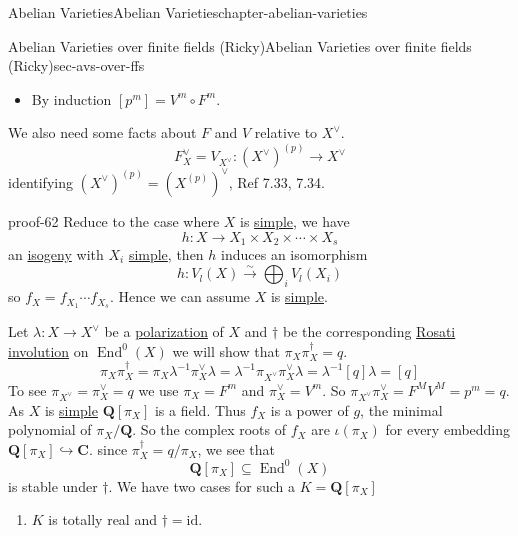 \documentclass[oneside,10pt,]{book}
\numberwithin{equation}{section}
\newcommand{\lb}{[}
\newcommand{\rb}{]}
\newcommand{\QQ}{\mathbf{Q}}
\newcommand{\CC}{\mathbf{C}}
\newcommand{\id}{\mathrm{id}}
\DeclareMathOperator{\End}{End}
\begin{document}
\begin{chapterptx}{Abelian Varieties}{}{Abelian Varieties}{}{}{chapter-abelian-varieties}
\begin{sectionptx}{Abelian Varieties over finite fields (Ricky)}{}{Abelian Varieties over finite fields (Ricky)}{}{}{sec-avs-over-ffs}
\begin{itemize}[label=\textbullet]
\item{}By induction \(\lb p^m\rb = V^m \circ F^m\).%
\end{itemize}
%
\par
\hypertarget{p-367}{}%
We also need some facts about \(F\) and \(V\) relative to \(X^\vee\).%
\begin{equation*}
F_X^\vee = V_{X^\vee} \colon (X^\vee)^{(p)} \to X^\vee
\end{equation*}
identifying \((X^\vee)^{(p)} = (X^{(p)})^\vee\), Ref 7.33, 7.34.%
\begin{proofptx}{}{proof-62}
\hypertarget{p-368}{}%
Reduce to the case where \(X\) is \hyperref[def-simple-av]{simple}, we have%
\begin{equation*}
h\colon X\to X_1 \times X_2 \times \cdots \times X_s
\end{equation*}
an \hyperref[def-supersing-isog-isog]{isogeny} with \(X_i\) \hyperref[def-simple-av]{simple}, then \(h\) induces an isomorphism%
\begin{equation*}
h\colon V_l(X)\xrightarrow{\sim} \bigoplus_i V_l(X_i)
\end{equation*}
so \(f_X = f_{X_1} \cdots f_{X_s}\). Hence we can assume \(X\) is \hyperref[def-simple-av]{simple}.%
\par
\hypertarget{p-369}{}%
Let \(\lambda \colon X \to X^\vee\) be a \hyperref[def-c-pol]{polarization} of \(X\) and \(\dagger\) be the corresponding \hyperref[sec-rosati]{Rosati involution} on \(\End^0(X)\) we will show that \(\pi_X\pi_X^\dagger = q\).%
\begin{equation*}
\pi_X \pi_X^\dagger = \pi_X \lambda^{-1} \pi_X^\vee \lambda = \lambda^{-1} \pi_{X^\vee} \pi_X^\vee \lambda = \lambda^{-1} \lb q \rb \lambda = \lb q \rb
\end{equation*}
To see \(\pi_{X^\vee} = \pi_X^\vee = q\) we use \(\pi_X = F^m\) and \(\pi_X^\vee = V^m \). So \(\pi_{X^\vee} \pi_X^\vee = F^MV^M = p^m = q\). As \(X\) is \hyperref[def-simple-av]{simple} \(\QQ\lb \pi_X\rb\) is a field. Thus \(f_X\) is a power of \(g\), the minimal polynomial of \(\pi_X/\QQ\). So the complex roots of \(f_X\) are \(\iota(\pi_X)\)  for every embedding \(\QQ\lb \pi_X\rb\hookrightarrow \CC\). since \(\pi_X^\dagger = q/ \pi_X\), we see that%
\begin{equation*}
\QQ[\pi_X] \subseteq \End^0(X)
\end{equation*}
is stable under \(\dagger\). We have two cases for such a \(K = \QQ\lb \pi_X \rb \)\leavevmode%
\begin{enumerate}
\item\hypertarget{li-64}{}\(K\) is  totally real and \(\dagger = \id\).%

\end{enumerate}
\end{proofptx}
\end{sectionptx}
\end{chapterptx}
\end{document}
